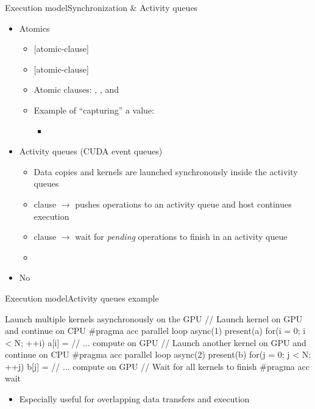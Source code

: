 \documentclass[12pt,aspectratio=169]{beamer}
\begin{document}
\begin{frame}[fragile]{Execution model}{Synchronization \& Activity queues}
  \begin{itemize}
  \item Atomics
    \begin{itemize}
    \item {} [atomic-clause]
    \item {} [atomic-clause]
    \item Atomic clauses: , ,
       and 
    \item Example of ``capturing'' a value:
      \begin{itemize}
      \item {}
      \end{itemize}
    \end{itemize}
  \item Activity queues (CUDA event queues)
    \begin{itemize}
    \item Data copies and kernels are launched synchronously inside the activity
      queues
    \item {} clause $\rightarrow$ pushes operations to
      an activity queue and host continues execution
    \item {} clause $\rightarrow$ wait for \emph{pending}
      operations to finish in an activity queue
    \item {}
    \end{itemize}
  \item No 
  \end{itemize}
\end{frame}

\begin{frame}[fragile]{Execution model}{Activity queues example}
  \begin{Cpplisting}{Launch multiple kernels asynchronously on the GPU}
// Launch kernel on GPU and continue on CPU
#pragma acc parallel loop async(1) present(a)
for(i = 0; i < N; ++i) {
  a[i] = // ... compute on GPU
}
// Launch another kernel on GPU and continue on CPU
#pragma acc parallel loop async(2) present(b)
for(j = 0; j < N; ++j) {
  b[j] = // ... compute on GPU
}
// Wait for all kernels to finish
#pragma acc wait
  \end{Cpplisting}
  \begin{itemize}
  \item Especially useful for overlapping data transfers and execution
  \end{itemize}
\end{frame}
\end{document}
